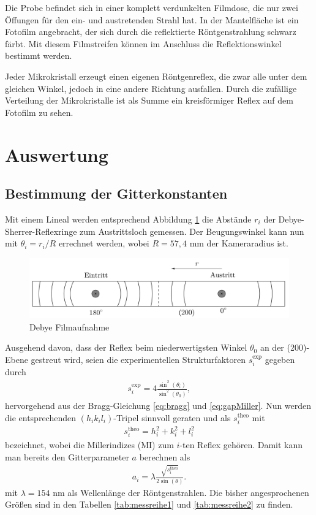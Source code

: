 Die Probe befindet sich in einer komplett verdunkelten Filmdose, die nur zwei Öffungen für den ein- und austretenden Strahl hat. In der Mantelfläche ist ein Fotofilm angebracht, der sich durch die reflektierte Röntgenstrahlung schwarz färbt. Mit diesem Filmstreifen können im Anschluss die Reflektionswinkel bestimmt werden.

Jeder Mikrokristall erzeugt einen eigenen Röntgenreflex, die zwar alle unter dem gleichen Winkel, jedoch in eine andere Richtung ausfallen. Durch die zufällige Verteilung der Mikrokristalle ist als Summe ein kreisförmiger Reflex auf dem Fotofilm zu sehen.


\section{Auswertung}
\subsection{Bestimmung der Gitterkonstanten}

Mit einem Lineal werden entsprechend Abbildung \ref{pic:debyefilm} die Abstände $r_i$ der Debye-Sherrer-Reflexringe zum Austrittsloch gemessen. Der 
Beugungswinkel kann nun mit $\theta_i = r_i/R$ errechnet werden, wobei $R=57,4$ mm der Kameraradius ist. 
\begin{figure}[H]
 \includegraphics[width=\textwidth]{../pics/debyestreifen.jpg}
 \caption{Debye Filmaufnahme}
 \label{pic:debyefilm}
\end{figure}
\noindent Ausgehend davon, dass der Reflex beim niederwertigsten
Winkel $\theta_0$ an der (200)-Ebene gestreut wird, seien die experimentellen Strukturfaktoren $s^\text{exp}_i$ gegeben durch
\begin{align}
 s^\text{exp}_i = 4\frac{\sin^2(\theta_i)}{\sin^2(\theta_0)},
 \label{eq:structExp}
\end{align}
hervorgehend aus der Bragg-Gleichung \eqref{eq:bragg} und \eqref{eq:gapMiller}. Nun werden die entsprechenden $(h_ik_il_i)$-Tripel sinnvoll geraten und als 
$s^\text{theo}_i$ mit
\begin{align}
 s^\text{theo}_i = h_i^2 + k_i^2 + l_i^2
 \label{eq:structTheo}
\end{align}
bezeichnet, wobei die Millerindizes (MI) zum $i$-ten Reflex gehören. Damit kann man bereits den Gitterparameter $a$ berechnen als
\begin{align}
 a_i = \lambda\frac{\sqrt{s^\text{theo}_i}}{2\sin(\theta)}.
 \label{eq:gitterparameter}
\end{align}
mit $\lambda=154$ nm als Wellenlänge der Röntgenstrahlen. Die bisher angesprochenen Größen sind in den Tabellen \ref{tab:messreihe1} und \ref{tab:messreihe2} zu finden.

